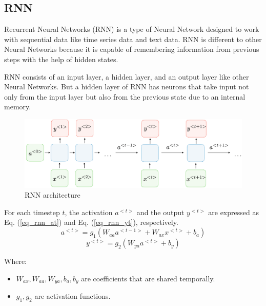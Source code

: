 \documentclass[conference]{IEEEtran}
\begin{document}
\subsection{RNN}
Recurrent Neural Networks (RNN) is a type of Neural Network designed to work with sequential data like time series data and text data. RNN is different to other Neural Networks because it is capable of remembering information from previous steps with the help of hidden states.\par
RNN consists of an input layer, a hidden layer, and an output layer like other Neural Networks. But a hidden layer of RNN has neurons that take input not only from the input layer but also from the previous state due to an internal memory.\par
\begin{figure}[H]
    \centering
    \begin{minipage}{0.45\textwidth}
    \centering
    \includegraphics[width=1\textwidth]{figures/method/RNN_architecture.png}
    \caption{RNN architecture}
    \label{fig_RNN_architecture}
    \end{minipage}
\end{figure}\par
For each timestep \(t\), the activation \(a^{<t>}\) and the output \(y^{<t>}\) are expressed as Eq. (\ref{eq_rnn_at}) and Eq. (\ref{eq_rnn_yt}), respectively.
\begin{equation}\label{eq_rnn_at}
a^{<t>} = g_1(W_{aa}a^{<t-1>} + W_{ax}x^{<t>} + b_a)
\end{equation}
\begin{equation}\label{eq_rnn_yt}
y^{<t>} = g_2(W_{ya}a^{<t>} + b_y)
\end{equation}\par
Where:\par
\begin{itemize}
    \item \(W_{ax}, W_{aa}, W_{ya}, b_a, b_y\) are coefficients that are shared temporally.\par
    \item \(g_1, g_2\) are activation functions.
\end{itemize}
\end{document}
